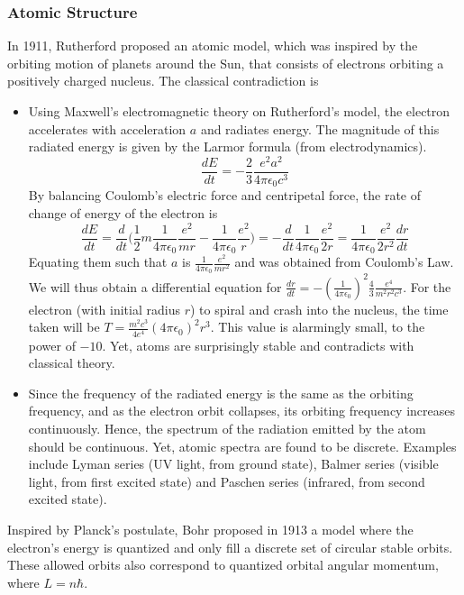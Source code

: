 \documentclass[a4paper]{article}
\begin{document}
\subsubsection*{Atomic Structure}
\begin{Note}
In 1911, Rutherford proposed an atomic model, which was inspired by the orbiting motion of planets around the Sun, that consists of electrons orbiting a positively charged nucleus. The classical contradiction is
\begin{itemize}
\item Using Maxwell's electromagnetic theory on Rutherford's model, the electron accelerates with acceleration $a$ and radiates energy. The magnitude of this radiated energy is given by the Larmor formula (from electrodynamics).
$$\frac{dE}{dt}=-\frac{2}{3}\frac{e^2a^2}{4\pi\epsilon_0c^3}$$
By balancing Coulomb's electric force and centripetal force, the rate of change of energy of the electron is 
$$\frac{dE}{dt}=\frac{d}{dt}\bigg(\frac{1}{2}m\frac{1}{4\pi\epsilon_0}\frac{e^2}{mr}-\frac{1}{4\pi\epsilon_0}\frac{e^2}{r}\bigg)=-\frac{d}{dt}\frac{1}{4\pi\epsilon_0}\frac{e^2}{2r}=\frac{1}{4\pi\epsilon_0}\frac{e^2}{2r^2}\frac{dr}{dt}$$
Equating them such that $a$ is $\frac{1}{4\pi\epsilon_0}\frac{e^2}{mr^2}$ and was obtained from Coulomb's Law. We will thus obtain a differential equation for $\frac{dr}{dt}=-(\frac{1}{4\pi\epsilon_0})^2\frac{4}{3}\frac{e^4}{m^2r^2c^3}$. For the electron (with initial radius $r$) to spiral and crash into the nucleus, the time taken will be
$T=\frac{m^2c^3}{4e^4}(4\pi\epsilon_0)^2r^3$. 
This value is alarmingly small, to the power of $-10$. Yet, atoms are surprisingly stable and contradicts with classical theory.
\item Since the frequency of the radiated energy is the same as the orbiting frequency, and as the electron orbit collapses, its orbiting frequency increases continuously. Hence, the spectrum of the radiation emitted by the atom should be continuous. Yet, atomic spectra are found to be discrete. Examples include Lyman series (UV light, from ground state), Balmer series (visible light, from first excited state) and Paschen series (infrared, from second excited state).
\end{itemize}
Inspired by Planck's postulate, Bohr proposed in 1913 a model where the electron's energy is quantized and only fill a discrete set of circular stable orbits. These allowed orbits also correspond to quantized orbital angular momentum, where $L=n\hbar$.\\[5pt]

\end{Note}
\end{document}
